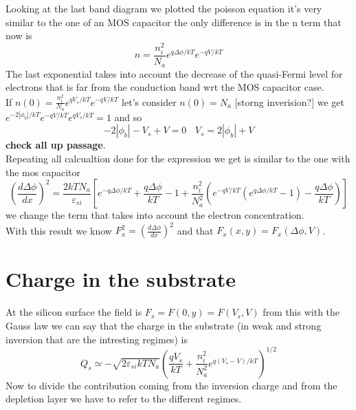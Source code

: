 Looking at the last band diagram we plotted the poisson equation it's very similar to the one of an MOS capacitor the only difference is in the n term that now is 
\begin{equation}
n=\frac{n_i^2}{N_a}e^{q\Delta \phi /kT}e^{-qV/kT}
\end{equation}
The last exponential takes into account the decrease of the quasi-Fermi level for electrons that is far from the conduction band wrt the MOS capacitor case.\\
If $n(0)=\frac{n_i^2}{N_a}e^{qV_s/kT}e^{-qV/kT}$ let's consider $n(0)=N_a$ [storng inverision?] we get $e^{-2|\phi_b|/kT}e^{-qV/kT}e^{qV_s/kT}=1$ and so
\begin{equation}
-2|\phi_b|-V_s+V=0 \ \ \ \ V_s=2|\phi_b|+V
\end{equation}
{\bf check all up passage}.\\
Repeating all calcualtion done for the expression we get is similar to the one with the mos capacitor
\begin{equation}
\left(\frac{d\Delta\phi}{dx}\right)^2=\frac{2kTN_a}{\varepsilon_{si}}[e^{-q\Delta\phi/kT}+\frac{q\Delta\phi}{kT}-1+\frac{n_i^2}{N_a^2}\left(e^{-qV/kT}(e^{q\Delta\phi/kT}-1)-\frac{q\Delta\phi}{kT}\right)]
\end{equation}
we change the term that takes into account the electron concentration.\\
With this result we know $F_x^2=\left(\frac{d\Delta\phi}{dx}\right)^2$ and that $F_x(x,y)=F_x(\Delta\phi,V)$.\\

\section{Charge in the substrate}
At the silicon surface the field is $F_s=F(0,y)=F(V_s,V)$ from this with the Gauss law we can say that the charge in the substrate (in weak and strong inversion that are the intresting regimes) is 
\begin{equation}
Q_s\simeq-\sqrt{2\varepsilon_{si}kTN_a}\left(\frac{qV_s}{kT}+\frac{n_i^2}{N_a^2}e^{q(V_s-V)/kT}\right)^{1/2}
\end{equation}
Now to divide the contribution coming from the inversion charge and from the depletion layer we have to refer to the different regimes.\\


